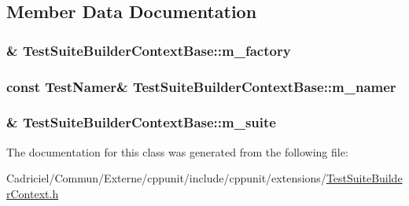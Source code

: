\subsection{Member Data Documentation}
\hypertarget{class_test_suite_builder_context_base_ad814ae6df45822300bf99dfcee0277f7}{
\subsubsection[{m\-\_\-factory}]{\& Test\-Suite\-Builder\-Context\-Base\-::m\-\_\-factory\hspace{0.3cm}{\ttfamily [protected]}}}\label{class_test_suite_builder_context_base_ad814ae6df45822300bf99dfcee0277f7}
\hypertarget{class_test_suite_builder_context_base_abdbbb982c6c41ae8ecc5abe954c56e70}{
\subsubsection[{m\-\_\-namer}]{\setlength{\rightskip}{0pt plus 5cm}const {\bf Test\-Namer}\& Test\-Suite\-Builder\-Context\-Base\-::m\-\_\-namer\hspace{0.3cm}{\ttfamily [protected]}}}\label{class_test_suite_builder_context_base_abdbbb982c6c41ae8ecc5abe954c56e70}
\hypertarget{class_test_suite_builder_context_base_a16ea2e4d82cd9f94b843839dc8ed2931}{
\subsubsection[{m\-\_\-suite}]{\& Test\-Suite\-Builder\-Context\-Base\-::m\-\_\-suite\hspace{0.3cm}{\ttfamily [protected]}}}\label{class_test_suite_builder_context_base_a16ea2e4d82cd9f94b843839dc8ed2931}


The documentation for this class was generated from the following file\-:\begin{DoxyCompactItemize}
\item 
Cadriciel/\-Commun/\-Externe/cppunit/include/cppunit/extensions/\hyperlink{_test_suite_builder_context_8h}{Test\-Suite\-Builder\-Context.\-h}\end{DoxyCompactItemize}
